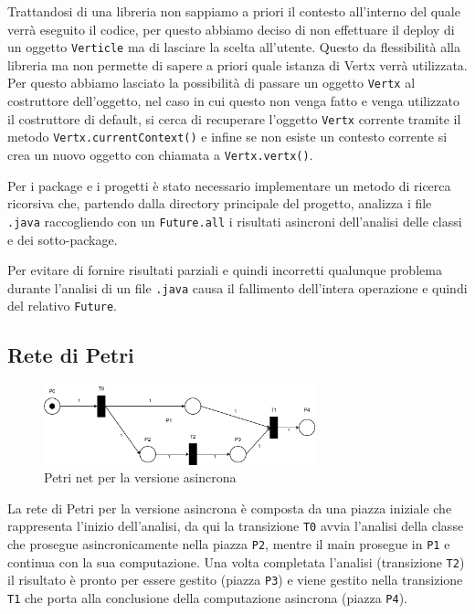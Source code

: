\documentclass[11pt,notitlepage]{article}
\begin{document}
Trattandosi di una libreria non sappiamo a priori il contesto all'interno del quale verrà eseguito il codice, per questo abbiamo deciso di non effettuare il deploy di
un oggetto \texttt{Verticle} ma di lasciare la scelta all'utente. Questo da flessibilità alla libreria ma non permette di sapere a priori quale istanza di Vertx verrà utilizzata.
Per questo abbiamo lasciato la possibilità di passare un oggetto \texttt{Vertx} al costruttore dell'oggetto, nel caso in cui questo non venga fatto e venga utilizzato il costruttore
di default, si cerca di recuperare l'oggetto \texttt{Vertx} corrente tramite il metodo \texttt{Vertx.currentContext()} e infine se non esiste un contesto corrente si crea un nuovo
oggetto con chiamata a \texttt{Vertx.vertx()}.

Per i package e i progetti è stato necessario implementare un metodo di ricerca ricorsiva che, partendo dalla directory principale del progetto, analizza i file \texttt{.java}
raccogliendo con un \texttt{Future.all} i risultati asincroni dell'analisi delle classi e dei sotto-package.

Per evitare di fornire risultati parziali e quindi incorretti qualunque problema durante l'analisi di un file \texttt{.java} causa il fallimento dell'intera operazione 
e quindi del relativo \texttt{Future}.

\subsection{Rete di Petri}

\begin{figure}[H]
    \centering
    \includegraphics[width=0.7\textwidth]{Petri_async.png}
    \caption{Petri net per la versione asincrona}
    \label{fig:rete-petri-asincrona}
\end{figure}

La rete di Petri per la versione asincrona è composta da una piazza iniziale che rappresenta l'inizio dell'analisi, da qui la transizione \texttt{T0} avvia l'analisi della classe
che prosegue asincronicamente nella piazza \texttt{P2}, mentre il main prosegue in \texttt{P1} e continua con la sua computazione. Una volta completata l'analisi 
(transizione \texttt{T2}) il risultato è pronto per essere gestito (piazza \texttt{P3}) e viene gestito nella transizione \texttt{T1} che porta alla conclusione 
della computazione asincrona (piazza \texttt{P4}).
\end{document}
